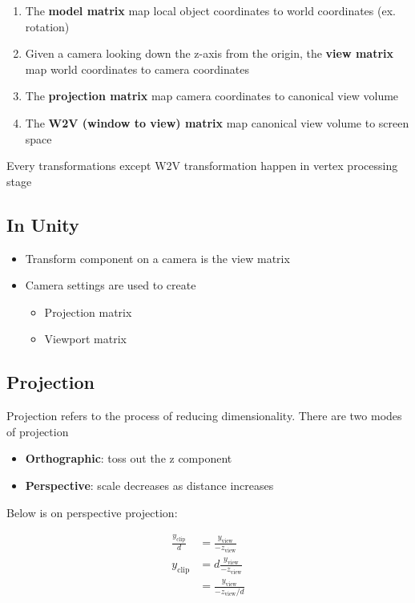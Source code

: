   \begin{enumerate}
    \item The \textbf{model matrix} map local object coordinates to
    world coordinates (ex. rotation)
    \item Given a camera looking down the z-axis from the origin,
    the \textbf{view matrix} map world coordinates to camera coordinates
    \item The \textbf{projection matrix} map camera coordinates to canonical
    view volume
    \item The \textbf{W2V (window to view) matrix} map canonical view volume
    to screen space
  \end{enumerate}

  Every transformations except W2V transformation happen in vertex
  processing stage

  \subsection{In Unity}

    \begin{itemize}
      \item Transform component on a camera is the view matrix
      \item Camera settings are used to create
      \begin{itemize}
        \item Projection matrix
        \item Viewport matrix
      \end{itemize}
    \end{itemize}

  \subsection{Projection}

    Projection refers to the process of reducing dimensionality. There are two
    modes of projection

    \begin{itemize}
      \item \textbf{Orthographic}: toss out the z component
      \item \textbf{Perspective}: scale decreases as distance increases
    \end{itemize}

    Below is on perspective projection:

    \begin{align}
      \frac{y_{\text{clip}}}{d} &= \frac{y_{\text{view}}}{-z_{\text{view}}} \\
      y_{\text{clip}}
      &= d\frac{y_ {\text{view}}}{-z_{\text{view}}} \\
      &= \frac{y_{\text{view}}}{-z_{\text{view}} / d}
    \end{align}

